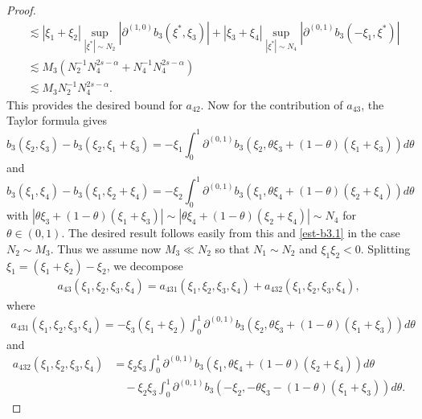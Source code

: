 \documentclass{amsart}
\theoremstyle{definition}
\theoremstyle{remark}
\numberwithin{equation}{section}
\begin{document}
\begin{proof}
\begin{align*}
      &\lesssim |\xi_1+\xi_2| \sup_{|\xi^\ast|\sim N_2}|\partial^{(1,0)}b_3(\xi^\ast, \xi_3)| + |\xi_3+\xi_4| \sup_{|\xi^\ast|\sim N_4}|\partial^{(0,1)}b_3(-\xi_1,\xi^\ast)|\\
      &\lesssim M_3(N_2^{-1}N_4^{2s-\alpha} + N_4^{-1}N_4^{2s-\alpha})\\
      &\lesssim M_3N_2^{-1}N_4^{2s-\alpha}.
    \end{align*}
    This provides the desired bound for $a_{42}$.
    Now for the contribution of $a_{43}$, the Taylor formula gives
    $$
    b_3(\xi_2,\xi_3)-b_3(\xi_2,\xi_1+\xi_3) = -\xi_1 \int_0^1 \partial^{(0,1)}b_3(\xi_2, \theta\xi_3+(1-\theta)(\xi_1+\xi_3))d\theta
    $$
    and
    $$
    b_3(\xi_1,\xi_4)-b_3(\xi_1,\xi_2+\xi_4) = -\xi_2\int_0^1\partial^{(0,1)}b_3(\xi_1, \theta\xi_4+(1-\theta)(\xi_2+\xi_4))d\theta
    $$
    with $|\theta\xi_3+(1-\theta)(\xi_1+\xi_3)|\sim |\theta\xi_4+(1-\theta)(\xi_2+\xi_4)|\sim N_4$ for $\theta\in(0,1)$. The desired result follows easily from this and \eqref{est-b3.1} in the case $N_2\sim M_3$. Thus we assume now $M_3\ll N_2$ so that $N_1\sim N_2$ and $\xi_1\xi_2<0$. Splitting $\xi_1=(\xi_1+\xi_2)-\xi_2$, we decompose 
   \begin{align*}
     a_{43}(\xi_1,\xi_2,\xi_3,\xi_4)=a_{431}(\xi_1,\xi_2,\xi_3,\xi_4) + a_{432}(\xi_1,\xi_2,\xi_3,\xi_4),
    \end{align*}  
 where   
      \begin{align*}
    a_{431}(\xi_1,\xi_2,\xi_3,\xi_4) = -\xi_3(\xi_1+\xi_2) \int_0^1 \partial^{(0,1)}b_3(\xi_2, \theta\xi_3+(1-\theta)(\xi_1+\xi_3))d\theta
    \end{align*}
    and 
     \begin{align*}
    a_{432}(\xi_1,\xi_2,\xi_3,\xi_4)& =\xi_2\xi_3 \int_0^1\partial^{(0,1)}b_3(\xi_1, \theta\xi_4+(1-\theta)(\xi_2+\xi_4))d\theta  \\ & \quad -\xi_2\xi_3  \int_0^1 \partial^{(0,1)}b_3(-\xi_2, -\theta\xi_3-(1-\theta)(\xi_1+\xi_3))d\theta  .
    \end{align*} 
    

\end{proof}
\end{document}
